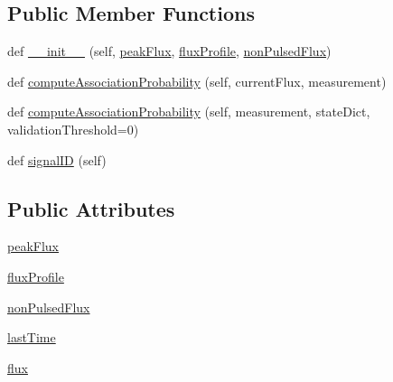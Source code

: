 \subsection*{Public Member Functions}
\begin{DoxyCompactItemize}
\item 
def \hyperlink{classmodest_1_1signals_1_1poissonsource_1_1PeriodicPoissonSource_ae95e11ccb3c412deb0ea534670be83a3}{\+\_\+\+\_\+init\+\_\+\+\_\+} (self, \hyperlink{classmodest_1_1signals_1_1poissonsource_1_1PeriodicPoissonSource_af88d243e09713ecde60baa40edfedc0b}{peak\+Flux}, \hyperlink{classmodest_1_1signals_1_1poissonsource_1_1PeriodicPoissonSource_a1ff79fd78ebfe4b659093620d0e03b31}{flux\+Profile}, \hyperlink{classmodest_1_1signals_1_1poissonsource_1_1PeriodicPoissonSource_a0aa4bf45a8d92b38e95817f7541b0a62}{non\+Pulsed\+Flux})
\item 
def \hyperlink{classmodest_1_1signals_1_1poissonsource_1_1PoissonSource_a2f8a73e6f51cbdcd0f1e646d6f4d4574}{compute\+Association\+Probability} (self, current\+Flux, measurement)
\item 
def \hyperlink{classmodest_1_1signals_1_1signalsource_1_1SignalSource_a3d32dbed840ea9ac775b226f0a654831}{compute\+Association\+Probability} (self, measurement, state\+Dict, validation\+Threshold=0)
\item 
def \hyperlink{classmodest_1_1signals_1_1signalsource_1_1SignalSource_a9a64c6a9c2954f6ad61e4ca3518ea8ab}{signal\+ID} (self)
\end{DoxyCompactItemize}
\subsection*{Public Attributes}
\begin{DoxyCompactItemize}
\item 
\hyperlink{classmodest_1_1signals_1_1poissonsource_1_1PeriodicPoissonSource_af88d243e09713ecde60baa40edfedc0b}{peak\+Flux}
\item 
\hyperlink{classmodest_1_1signals_1_1poissonsource_1_1PeriodicPoissonSource_a1ff79fd78ebfe4b659093620d0e03b31}{flux\+Profile}
\item 
\hyperlink{classmodest_1_1signals_1_1poissonsource_1_1PeriodicPoissonSource_a0aa4bf45a8d92b38e95817f7541b0a62}{non\+Pulsed\+Flux}
\item 
\hyperlink{classmodest_1_1signals_1_1poissonsource_1_1PoissonSource_a34395fc83bd8743a0a5ee69f9392a606}{last\+Time}
\item 
\hyperlink{classmodest_1_1signals_1_1poissonsource_1_1PoissonSource_a6f2c657ad936b921715d826ac74f7fe5}{flux}
\end{DoxyCompactItemize}
